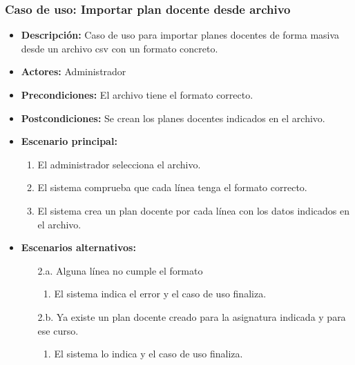 \documentclass{book}
\begin{document}
\subsubsection*{Caso de uso: Importar plan docente desde archivo}
\begin{itemize}
\item{\bf Descripción:} Caso de uso para importar planes docentes de forma masiva desde un archivo csv con un formato concreto.
\item{\bf Actores:} Administrador
\item{\bf Precondiciones:} El archivo tiene el formato correcto.
\item{\bf Postcondiciones:} Se crean los planes docentes indicados en el archivo.
\item{\bf Escenario principal:}
	\begin{enumerate}
	\item El administrador selecciona el archivo.
	\item El sistema comprueba que cada línea tenga el formato correcto.
	\item El sistema crea un plan docente por cada línea con los datos indicados en el archivo.
	\end{enumerate}
\item{\bf Escenarios alternativos:}
	\begin{itemize}
		\item[2.a.] Alguna línea no cumple el formato
		\begin{enumerate}
			\item El sistema indica el error y el caso de uso finaliza.
		\end{enumerate}
		\item[2.b.] Ya existe un plan docente creado para la asignatura indicada y para ese curso.
		\begin{enumerate}
			\item El sistema lo indica y el caso de uso finaliza.
		\end{enumerate}
	\end{itemize}
\end{itemize}
\end{document}
